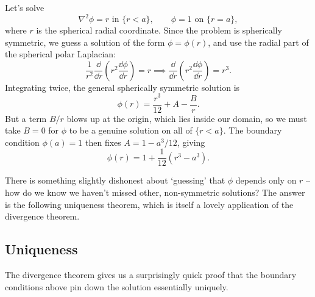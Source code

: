 \documentclass[a4paper]{scrartcl}
\begin{document}
\begin{example}
	Let's solve
	$$
	\nabla^2 \phi = r \text{ in } \{r < a\}, \quad \quad \phi = 1 \text{ on } \{r = a\},
	$$
	where $r$ is the spherical radial coordinate. Since the problem is spherically symmetric, we guess a solution of the form $\phi = \phi(r)$, and use the radial part of the spherical polar Laplacian:
	$$
	\frac{1}{r^2}\frac{\dd}{\dd r}\left(r^2 \frac{\dd \phi}{\dd r}\right) = r \implies \frac{\dd}{\dd r}\left(r^2 \frac{\dd \phi}{\dd r}\right) = r^3.
	$$
	Integrating twice, the general spherically symmetric solution is
	$$
	\phi(r) = \frac{r^3}{12} + A - \frac{B}{r}.
	$$
	But a term $B/r$ blows up at the origin, which lies inside our domain, so we must take $B = 0$ for $\phi$ to be a genuine solution on all of $\{r < a\}$. The boundary condition $\phi(a) = 1$ then fixes $A = 1 - a^3/12$, giving
	$$
	\phi(r) = 1 + \frac{1}{12}\left(r^3 - a^3\right).
	$$
\end{example}

There is something slightly dishonest about `guessing' that $\phi$ depends only on $r$ -- how do we know we haven't missed other, non-symmetric solutions? The answer is the following uniqueness theorem, which is itself a lovely application of the divergence theorem.

\subsection{Uniqueness}

The divergence theorem gives us a surprisingly quick proof that the boundary conditions above pin down the solution essentially uniquely.
\end{document}
